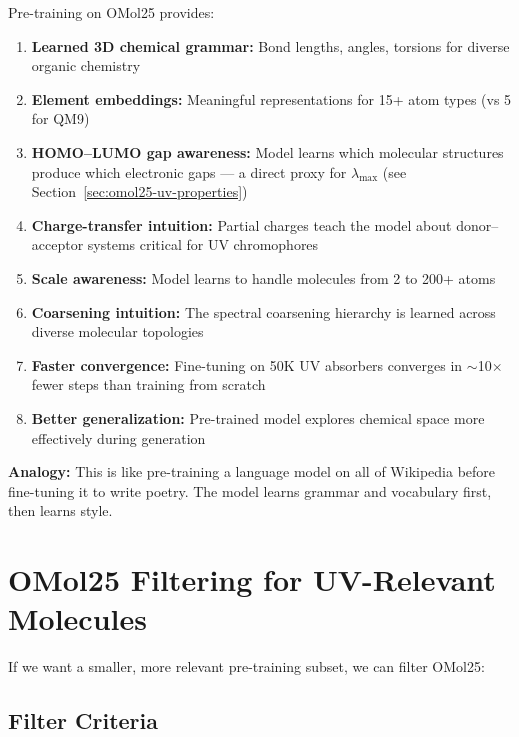 \documentclass[11pt,a4paper]{article}
\begin{document}
Pre-training on OMol25 provides:

\begin{enumerate}[nosep]
    \item \textbf{Learned 3D chemical grammar:} Bond lengths, angles, torsions
          for diverse organic chemistry
    \item \textbf{Element embeddings:} Meaningful representations for 15+
          atom types (vs 5 for QM9)
    \item \textbf{HOMO--LUMO gap awareness:} Model learns which molecular
          structures produce which electronic gaps --- a direct proxy for
          $\lambda_\text{max}$ (see Section~\ref{sec:omol25-uv-properties})
    \item \textbf{Charge-transfer intuition:} Partial charges teach the model
          about donor--acceptor systems critical for UV chromophores
    \item \textbf{Scale awareness:} Model learns to handle molecules from 2 to
          200+ atoms
    \item \textbf{Coarsening intuition:} The spectral coarsening hierarchy is
          learned across diverse molecular topologies
    \item \textbf{Faster convergence:} Fine-tuning on 50K UV absorbers converges
          in $\sim$10$\times$ fewer steps than training from scratch
    \item \textbf{Better generalization:} Pre-trained model explores chemical
          space more effectively during generation
\end{enumerate}

\textbf{Analogy:} This is like pre-training a language model on all of Wikipedia
before fine-tuning it to write poetry. The model learns grammar and vocabulary
first, then learns style.

\section{OMol25 Filtering for UV-Relevant Molecules}

If we want a smaller, more relevant pre-training subset, we can filter OMol25:

\subsection{Filter Criteria}
\end{document}
